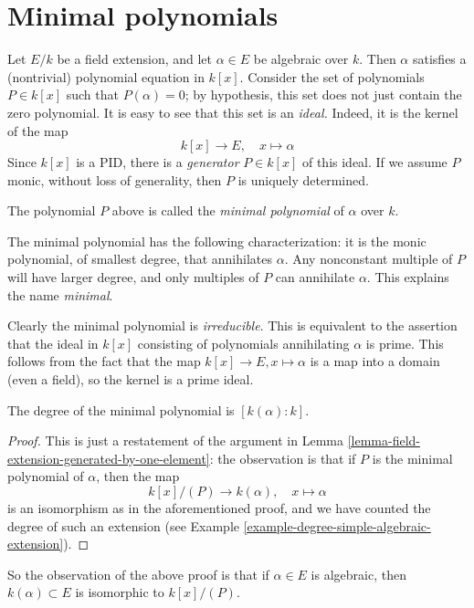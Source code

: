 \section{Minimal polynomials}
\label{section-minimal-polynomials}

\noindent
Let $E/k$ be a field extension, and let $\alpha \in E$ be algebraic over $k$.
Then $\alpha$ satisfies a (nontrivial) polynomial equation in $k[x]$.
Consider the set of polynomials $P \in k[x]$ such that $P(\alpha) = 0$; by
hypothesis, this set does not just contain the zero polynomial.
It is easy to see that this set is an {\it ideal.} Indeed, it is the kernel
of the map
$$
k[x] \to E, \quad x \mapsto \alpha
$$
Since $k[x]$ is a PID, there is a {\it generator} $P \in k[x]$ of this
ideal. If we assume $P$ monic, without loss of generality, then $P$ is
uniquely determined.

\begin{definition}
\label{definition-minimal-polynomial}
The polynomial $P$ above is called the {\it minimal polynomial}
of $\alpha$ over $k$.
\end{definition}

\noindent
The minimal polynomial has the following characterization: it is the monic
polynomial, of smallest degree, that annihilates $\alpha$. Any nonconstant
multiple of $P$ will have larger degree, and only multiples of $P$ can
annihilate $\alpha$. This explains the name {\it minimal}.

\medskip\noindent
Clearly the minimal polynomial is {\it irreducible}. This is equivalent to the
assertion that the ideal in $k[x]$ consisting of polynomials annihilating
$\alpha$ is prime. This follows from the fact that the map
$k[x] \to E, x \mapsto \alpha$ is a map into a domain (even a field), so the
kernel is a prime ideal.

\begin{lemma}
\label{lemma-degree-minimal-polynomial}
The degree of the minimal polynomial is $[k(\alpha) : k]$.
\end{lemma}

\begin{proof}
This is just a restatement of the argument in
Lemma \ref{lemma-field-extension-generated-by-one-element}: the observation
is that if $P$ is the minimal polynomial of $\alpha$, then the map
$$
k[x]/(P) \to k(\alpha), \quad x \mapsto \alpha
$$
is an isomorphism as in the aforementioned proof, and we have counted the
degree of such an extension (see
Example \ref{example-degree-simple-algebraic-extension}).
\end{proof}

\noindent
So the observation of the above proof is that if $\alpha \in E$ is algebraic,
then $k(\alpha) \subset E$ is isomorphic to $k[x]/(P)$.



